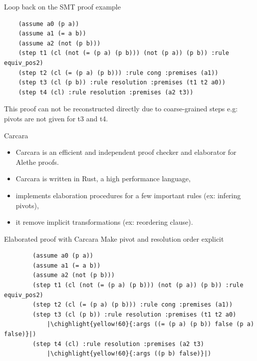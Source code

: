 \documentclass[aspectratio=169,xcolor={dvipsnames}]{beamer}
\newcommand\chighlight[2]{\setlength{\fboxsep}{0pt}\colorbox{#1}{#2\strut}}
\begin{document}
\begin{frame}[fragile]{Loop back on the SMT proof example}
\begin{verbatim}
    (assume a0 (p a))
    (assume a1 (= a b))
    (assume a2 (not (p b)))
    (step t1 (cl (not (= (p a) (p b))) (not (p a)) (p b)) :rule equiv_pos2)
    (step t2 (cl (= (p a) (p b))) :rule cong :premises (a1))
    (step t3 (cl (p b)) :rule resolution :premises (t1 t2 a0))
    (step t4 (cl) :rule resolution :premises (a2 t3))
\end{verbatim}
\vfill
This proof can not be reconstructed directly due to coarse-grained steps e.g: pivots are not given for t3 and t4. 
\end{frame}

\begin{frame}{Carcara}
    \begin{itemize}
    \item Carcara is an efficient and independent proof checker and
    elaborator for Alethe proofs.
    \item Carcara is written in Rust, a high performance language,
    \item implements elaboration procedures for a few important rules (ex: infering pivots),
    \item it remove implicit transformations (ex: reordering clause).
    \end{itemize}
\end{frame}


\begin{frame}[fragile]{Elaborated proof with Carcara}
    Make pivot and resolution order explicit\\
    \begin{verbatim}
        (assume a0 (p a))
        (assume a1 (= a b))
        (assume a2 (not (p b)))
        (step t1 (cl (not (= (p a) (p b))) (not (p a)) (p b)) :rule equiv_pos2)
        (step t2 (cl (= (p a) (p b))) :rule cong :premises (a1))
        (step t3 (cl (p b)) :rule resolution :premises (t1 t2 a0)
            |\chighlight{yellow!60}{:args ((= (p a) (p b)) false (p a) false)}|)
        (step t4 (cl) :rule resolution :premises (a2 t3)
            |\chighlight{yellow!60}{:args ((p b) false)}|)
    \end{verbatim}
\end{frame}
\end{document}
